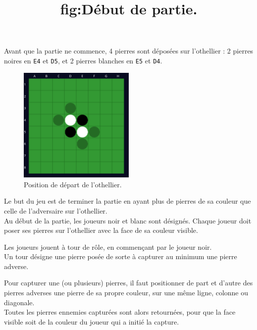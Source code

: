 \documentclass[a4paper,12pt]{article}
\begin{document}
\vspace{0.4cm}

Avant que la partie ne commence, 4 pierres sont déposées sur l'othellier : 2
pierres noires en \texttt{E4} et \texttt{D5}, et 2 pierres blanches en
\texttt{E5} et \texttt{D4}.

\begin{figure}[h]
    \centering
    \includegraphics[width=0.5\textwidth]{images/othello_rules_start.png}
    \caption{Position de départ de l'othellier.}
    \title{fig:Début de partie.}
\end{figure}

\vspace{0.4cm}

Le but du jeu est de terminer la partie en ayant plus de pierres de sa couleur
que celle de l’adversaire sur l’othellier. \\ Au début de la partie, les
joueurs noir et blanc sont désignés. Chaque joueur doit poser ses pierres sur
l’othellier avec la face de sa couleur visible.

\vspace{0.4cm}

Les joueurs jouent à tour de rôle, en commençant par le joueur noir. \\ Un tour
désigne une pierre posée de sorte à capturer au minimum une pierre adverse.

\vspace{0.4cm}

Pour capturer une (ou plusieurs) pierres, il faut positionner de part et
d’autre des pierres adverses une pierre de sa propre couleur, sur une même
ligne, colonne ou diagonale. \\ Toutes les pierres ennemies capturées sont
alors retournées, pour que la face visible soit de la couleur du joueur qui a
initié la capture. \\
\end{document}
